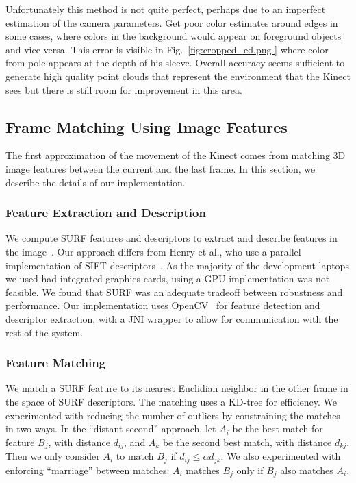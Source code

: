 \documentclass[letterpaper, 10pt, conference]{ieeeconf}
\begin{document}
Unfortunately this method is not quite perfect, perhaps due to an imperfect estimation of the camera parameters.  Get poor color estimates around edges in some cases, where colors in the background would appear on foreground objects and vice versa.  This error is visible in Fig.~\ref{fig:cropped_ed.png } where color from pole appears at the depth of his sleeve.  Overall accuracy seems sufficient to generate high quality point clouds that represent the environment that the Kinect sees but there is still room for improvement in this area. 

\subsection{Frame Matching Using Image Features}
The first approximation of the movement of the Kinect comes from matching 3D image
features between the current and the last frame. In this section, we describe the details
of our implementation.

\subsubsection{Feature Extraction and Description}
We compute SURF features and descriptors
to extract and describe features in the image~\cite{Bay06surf}. Our approach differs
from Henry et al., who use a parallel implementation of SIFT descriptors~\cite{SIFTGPU}.
As the majority of the development laptops we used had integrated graphics cards, using
a GPU implementation was not feasible. We found that SURF was an adequate tradeoff
between robustness and performance. Our implementation uses OpenCV~\cite{opencv_library}
for feature detection and descriptor extraction, with a JNI wrapper to allow for
communication with the rest of the system.

\subsubsection{Feature Matching}
We match a SURF feature to its nearest Euclidian neighbor in the other frame in the space
of SURF descriptors. The matching
uses a KD-tree for efficiency. We experimented with reducing the number of outliers by
constraining the matches in two ways. In the ``distant second'' approach, let $A_i$ be the
best match for feature $B_j$, with distance $d_{ij}$, and $A_k$ be the second best match,
with distance $d_{kj}$. Then we only consider $A_i$ to match $B_j$ if $d_{ij} \le \alpha d_{jk}$.
We also experimented with enforcing ``marriage'' between matches: $A_i$ matches $B_j$ only if
$B_j$ also matches $A_i$.
\end{document}
